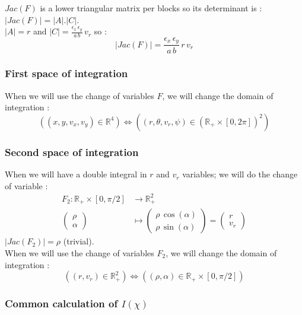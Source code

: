 \documentclass[10pt]{article}
\begin{document}
$Jac(F)$ is a lower triangular matrix per blocks so its determinant is : $|Jac(F)| = |A|.|C|$. \\
$|A| = r$ and $|C| = \frac{\epsilon_{x}\,\epsilon_{y}}{a\,b}\,v_r$ so : \\
$$\boxed{|Jac(F)| = \frac{\epsilon_{x}\,\epsilon_{y}}{a\,b}\,r\,v_r}$$


\subsubsection{First space of integration}


When we will use the change of variables $F$, we will change the domain of integration :
$$\boxed{\left((x,y,v_x,v_y)\in\mathbb{R}^4\right)\iff\left((r,\theta,v_r,\psi)\in\left(\mathbb{R}_{+}\times\left[0,2\pi\right]\right)^2\right)}$$


\subsubsection{Second space of integration}


When we will have a double integral in $r$ and $v_r$ variables; we will do the change of variable :
\begin{align*}
  F_2 : \mathbb{R}_{+}\times\left[0,\pi/2\right] &\to \mathbb{R}_{+}^2 \\
  \left( \begin{array}{cc} \rho \\ \alpha \end{array} \right) &\mapsto
  \left( \begin{array}{cc} \rho\,\cos(\alpha) \\ \rho\,\sin(\alpha)
          \end{array} \right) = 
          \left( \begin{array}{cc} r \\ v_r
          \end{array} \right)
\end{align*}
$|Jac(F_2)| = \rho$ (trivial). \\
When we will use the change of variables $F_2$, we will change the domain of integration :
$$\boxed{\left((r,v_r)\in\mathbb{R}_{+}^2\right)\iff\left((\rho,\alpha)\in\mathbb{R}_{+}\times\left[0,\pi/2\right]\right)}$$


\subsubsection{Common calculation of $I(\chi)$}
\end{document}
